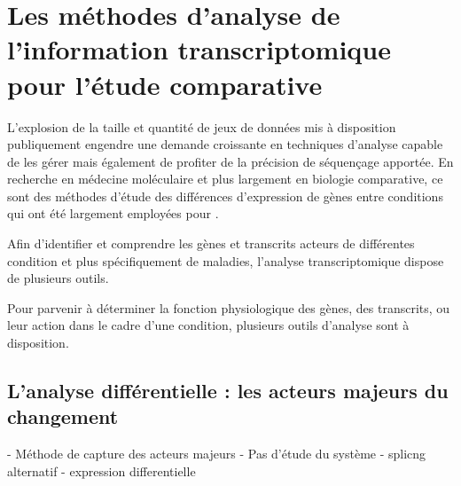 
\section{Les méthodes d'analyse de l'information transcriptomique pour l'étude comparative}


L'explosion de la taille et quantité de jeux de données mis à disposition publiquement engendre une demande croissante en techniques d'analyse capable de les gérer mais également de profiter de la précision de séquençage apportée. En recherche en médecine moléculaire et plus largement en biologie comparative, ce sont des méthodes d'étude des différences d'expression de gènes entre conditions qui ont été largement employées pour .









Afin d'identifier et comprendre les gènes et transcrits acteurs de différentes condition et plus spécifiquement de maladies, l'analyse transcriptomique dispose de plusieurs outils. 


Pour parvenir à déterminer la fonction physiologique des gènes, des transcrits, ou leur action dans le cadre d'une condition, plusieurs outils d'analyse sont à disposition.




 




\subsection{L'analyse différentielle : les acteurs majeurs du changement}


- Méthode de capture des acteurs majeurs
- Pas d'étude du système 
- splicng alternatif
- expression differentielle


